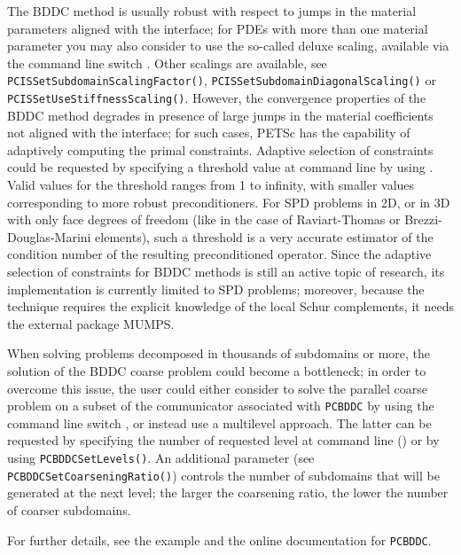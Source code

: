 The BDDC method is usually robust with respect to jumps in the material parameters aligned with the interface;
for PDEs with more than one material parameter you may also consider to use the so-called deluxe scaling,
available via the command line switch . Other scalings are available,
see \lstinline{PCISSetSubdomainScalingFactor()}, \break\lstinline{PCISSetSubdomainDiagonalScaling()} or \lstinline{PCISSetUseStiffnessScaling()}.
However, the convergence properties of the BDDC method degrades in presence of large jumps in the material coefficients
not aligned with the interface; for such cases, PETSc has the capability of adaptively computing the primal constraints.
Adaptive selection of constraints could be requested by specifying a threshold value at command line by using
. Valid values for the threshold  ranges from 1 to infinity,
with smaller values corresponding to more robust preconditioners. For SPD problems in 2D, or in 3D with only face degrees of freedom
(like in the case of Raviart-Thomas or Brezzi-Douglas-Marini elements), such a threshold is a very accurate estimator
of the condition number of the resulting preconditioned operator. Since the adaptive selection of constraints for BDDC methods is still
an active topic of research, its implementation is currently limited to SPD problems; moreover, because the technique requires the
explicit knowledge of the local Schur complements, it needs the external package MUMPS.

When solving problems decomposed in thousands of subdomains or more, the solution of the BDDC coarse problem could become a bottleneck;
in order to overcome this issue, the user could either consider to solve the parallel coarse problem on a subset of the communicator
associated with \lstinline{PCBDDC} by using the command line switch , or instead use a multilevel approach.
The latter can be requested by specifying the number of requested level at command line () or by using \lstinline{PCBDDCSetLevels()}.
An additional parameter (see \lstinline{PCBDDCSetCoarseningRatio()}) controls the number of subdomains that will be generated at the next level;
the larger the coarsening ratio, the lower the number of coarser subdomains.

For further details, see the example \href{http://www.mcs.anl.gov/petsc/petsc-current/src/ksp/ksp/examples/tutorials/ex59.c}{} and the online documentation for \lstinline{PCBDDC}.

